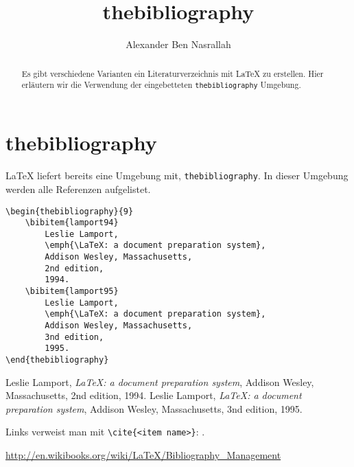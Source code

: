 \documentclass[a4paper]{article}
\title{thebibliography}
\author{Alexander Ben Nasrallah}
\begin{document}
\maketitle

\begin{abstract}
Es gibt verschiedene Varianten ein Literaturverzeichnis mit \LaTeX{} zu
erstellen. Hier erläutern wir die Verwendung der eingebetteten \verb+thebibliography+
Umgebung.
\end{abstract}

\section{thebibliography}
\LaTeX{} liefert bereits eine Umgebung mit, \verb+thebibliography+. In dieser
Umgebung werden alle Referenzen aufgelistet.

\begin{lstlisting}[]
\begin{thebibliography}{9}
	\bibitem{lamport94}
		Leslie Lamport,
		\emph{\LaTeX: a document preparation system},
		Addison Wesley, Massachusetts,
		2nd edition,
		1994.
	\bibitem{lamport95}
		Leslie Lamport,
		\emph{\LaTeX: a document preparation system},
		Addison Wesley, Massachusetts,
		3nd edition,
		1995.
\end{thebibliography}
\end{lstlisting}

\begin{thebibliography}{9}
		Leslie Lamport,
		\emph{\LaTeX: a document preparation system},
		Addison Wesley, Massachusetts,
		2nd edition,
		1994.
		Leslie Lamport,
		\emph{\LaTeX: a document preparation system},
		Addison Wesley, Massachusetts,
		3nd edition,
		1995.
\end{thebibliography}

Links verweist man mit \verb+\cite{<item name>}+: \cite{lamport94}.


\url{http://en.wikibooks.org/wiki/LaTeX/Bibliography_Management}
\end{document}
